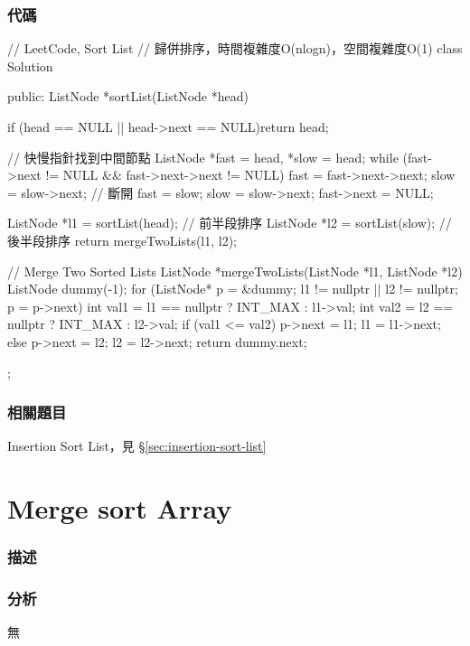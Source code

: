 \subsubsection{代碼}
\begin{Code}
// LeetCode, Sort List
// 歸併排序，時間複雜度O(nlogn)，空間複雜度O(1)
class Solution {
public:
    ListNode *sortList(ListNode *head) {
        if (head == NULL || head->next == NULL)return head;

        // 快慢指針找到中間節點
        ListNode *fast = head, *slow = head;
        while (fast->next != NULL && fast->next->next != NULL) {
            fast = fast->next->next;
            slow = slow->next;
        }
        // 斷開
        fast = slow;
        slow = slow->next;
        fast->next = NULL;

        ListNode *l1 = sortList(head);  // 前半段排序
        ListNode *l2 = sortList(slow);  // 後半段排序
        return mergeTwoLists(l1, l2);
    }

    // Merge Two Sorted Lists
    ListNode *mergeTwoLists(ListNode *l1, ListNode *l2) {
        ListNode dummy(-1);
        for (ListNode* p = &dummy; l1 != nullptr || l2 != nullptr; p = p->next) {
            int val1 = l1 == nullptr ? INT_MAX : l1->val;
            int val2 = l2 == nullptr ? INT_MAX : l2->val;
            if (val1 <= val2) {
                p->next = l1;
                l1 = l1->next;
            } else {
                p->next = l2;
                l2 = l2->next;
            }
        }
        return dummy.next;
    }
};
\end{Code}


\subsubsection{相關題目}
\begindot
\item Insertion Sort List，見 \S \ref{sec:insertion-sort-list}
\myenddot

\section{Merge sort Array} %
\label{sec:merge-sort-array}


\subsubsection{描述}


\subsubsection{分析}
無


